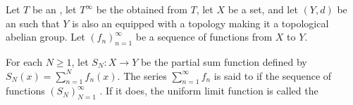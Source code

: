 \begin{definition} \label{definition:uniform_convergence_of_a_series_of_functions_from_a_set_to_an_extended_metric_space}
Let $T$ be an , let $T^\infty$ be the  obtained from $T$, let $X$ be a set, and let $(Y, d)$ be an  such that $Y$ is also an  equipped with a topology making it a topological abelian group. Let $(f_n)_{n=1}^\infty$ be a sequence of functions from $X$ to $Y$.

For each $N \geq 1$, let $S_N : X \to Y$ be the partial sum function defined by $S_N(x) = \sum_{n=1}^N f_n(x)$. The series $\sum_{n=1}^\infty f_n$ is said to  if the sequence of functions $(S_N)_{N=1}^\infty$ . If it does, the uniform limit function is called the 
\end{definition}
